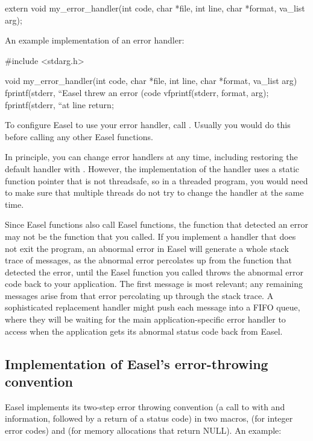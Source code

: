 \documentclass[11pt]{article}
\begin{document}
\begin{cchunk}
extern void my_error_handler(int code, char *file, int line, char *format, va_list arg);
\end{cchunk}

An example implementation of an error handler:

\begin{cchunk}
#include <stdarg.h>

void
my_error_handler(int code, char *file, int line, char *format, va_list arg)
{
  fprintf(stderr, ``Easel threw an error (code %
  vfprintf(stderr, format, arg);
  fprintf(stderr, ``at line %
  return;
}
\end{cchunk}

To configure Easel to use your error handler, call
. Usually you would do
this before calling any other Easel functions.

In principle, you can change error handlers at any time, including
restoring the default handler with
. However, the implementation
of the handler uses a static function pointer that is not threadsafe,
so in a threaded program, you would need to make sure that multiple
threads do not try to change the handler at the same time.

Since Easel functions also call Easel functions, the function that
detected an error may not be the function that you called.  If you
implement a handler that does not exit the program, an abnormal error
in Easel will generate a whole stack trace of 
messages, as the abnormal error percolates up from the function that
detected the error, until the Easel function you called throws the
abnormal error code back to your application. The first
 message is most relevant; any remaining messages
arise from that error percolating up through the stack trace.  A
sophisticated replacement  handler might push each
 message into a FIFO queue, where they will be
waiting for the main application-specific error handler to access when
the application gets its abnormal status code back from Easel.

\subsection{Implementation of Easel's error-throwing convention}

Easel implements its two-step error throwing convention (a call to
 with  and 
information, followed by a return of a status code) in two macros,
 (for integer error codes) and
 (for memory allocations that return
NULL). An example:
\end{document}
